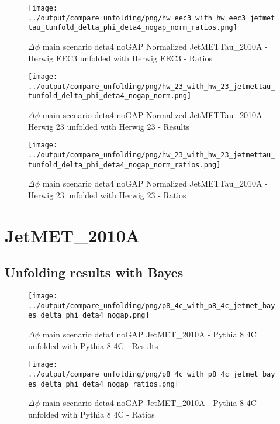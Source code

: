 \documentclass[11pt]{book}
\begin{document}
\begin{figure}[ht]
\centering
\texttt{[image: ../output/compare\_unfolding/png/hw\_eec3\_with\_hw\_eec3\_jetmettau\_tunfold\_delta\_phi\_deta4\_nogap\_norm\_ratios.png]}
\caption{$\Delta\phi$ main scenario deta4 noGAP Normalized JetMETTau\_2010A - Herwig EEC3 unfolded with Herwig EEC3 - Ratios}
\label{hw_eec3_hw_eec3_jetmettau_tunfold_delta_phi_deta4_nogap_norm_b}
\end{figure}

\begin{figure}[ht]
\centering
\texttt{[image: ../output/compare\_unfolding/png/hw\_23\_with\_hw\_23\_jetmettau\_tunfold\_delta\_phi\_deta4\_nogap\_norm.png]}
\caption{$\Delta\phi$ main scenario deta4 noGAP Normalized JetMETTau\_2010A - Herwig 23 unfolded with Herwig 23 - Results}
\label{hw_23_hw_23_jetmettau_tunfold_delta_phi_deta4_nogap_norm_a}
\end{figure}

\begin{figure}[ht]
\centering
\texttt{[image: ../output/compare\_unfolding/png/hw\_23\_with\_hw\_23\_jetmettau\_tunfold\_delta\_phi\_deta4\_nogap\_norm\_ratios.png]}
\caption{$\Delta\phi$ main scenario deta4 noGAP Normalized JetMETTau\_2010A - Herwig 23 unfolded with Herwig 23 - Ratios}
\label{hw_23_hw_23_jetmettau_tunfold_delta_phi_deta4_nogap_norm_b}
\end{figure}



\clearpage
\section{JetMET\_2010A}
\subsection{Unfolding results with Bayes}

\begin{figure}[ht]
\centering
\texttt{[image: ../output/compare\_unfolding/png/p8\_4c\_with\_p8\_4c\_jetmet\_bayes\_delta\_phi\_deta4\_nogap.png]}
\caption{$\Delta\phi$ main scenario deta4 noGAP JetMET\_2010A - Pythia 8 4C unfolded with Pythia 8 4C - Results}
\label{p8_p8_jetmet_bayes_delta_phi_deta4_nogap_a}
\end{figure}

\begin{figure}[ht]
\centering
\texttt{[image: ../output/compare\_unfolding/png/p8\_4c\_with\_p8\_4c\_jetmet\_bayes\_delta\_phi\_deta4\_nogap\_ratios.png]}
\caption{$\Delta\phi$ main scenario deta4 noGAP JetMET\_2010A - Pythia 8 4C unfolded with Pythia 8 4C - Ratios}
\label{p8_p8_jetmet_bayes_delta_phi_deta4_nogap_b}
\end{figure}
\end{document}

